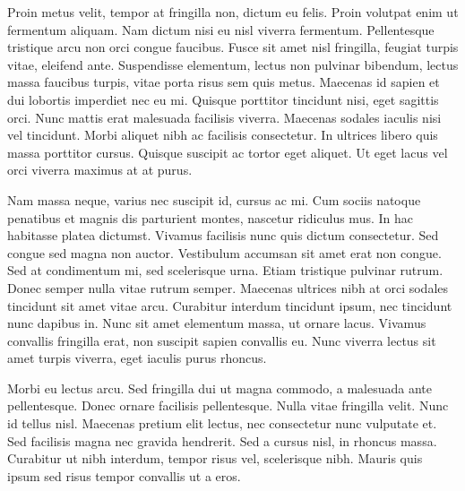Proin metus velit, tempor at fringilla non, dictum eu felis. Proin volutpat enim ut fermentum aliquam. Nam dictum nisi eu nisl viverra fermentum. Pellentesque tristique arcu non orci congue faucibus. Fusce sit amet nisl fringilla, feugiat turpis vitae, eleifend ante. Suspendisse elementum, lectus non pulvinar bibendum, lectus massa faucibus turpis, vitae porta risus sem quis metus. Maecenas id sapien et dui lobortis imperdiet nec eu mi. Quisque porttitor tincidunt nisi, eget sagittis orci. Nunc mattis erat malesuada facilisis viverra. Maecenas sodales iaculis nisi vel tincidunt. Morbi aliquet nibh ac facilisis consectetur. In ultrices libero quis massa porttitor cursus. Quisque suscipit ac tortor eget aliquet. Ut eget lacus vel orci viverra maximus at at purus.

Nam massa neque, varius nec suscipit id, cursus ac mi. Cum sociis natoque penatibus et magnis dis parturient montes, nascetur ridiculus mus. In hac habitasse platea dictumst. Vivamus facilisis nunc quis dictum consectetur. Sed congue sed magna non auctor. Vestibulum accumsan sit amet erat non congue. Sed at condimentum mi, sed scelerisque urna. Etiam tristique pulvinar rutrum. Donec semper nulla vitae rutrum semper. Maecenas ultrices nibh at orci sodales tincidunt sit amet vitae arcu. Curabitur interdum tincidunt ipsum, nec tincidunt nunc dapibus in. Nunc sit amet elementum massa, ut ornare lacus. Vivamus convallis fringilla erat, non suscipit sapien convallis eu. Nunc viverra lectus sit amet turpis viverra, eget iaculis purus rhoncus.

Morbi eu lectus arcu. Sed fringilla dui ut magna commodo, a malesuada ante pellentesque. Donec ornare facilisis pellentesque. Nulla vitae fringilla velit. Nunc id tellus nisl. Maecenas pretium elit lectus, nec consectetur nunc vulputate et. Sed facilisis magna nec gravida hendrerit. Sed a cursus nisl, in rhoncus massa. Curabitur ut nibh interdum, tempor risus vel, scelerisque nibh. Mauris quis ipsum sed risus tempor convallis ut a eros.

